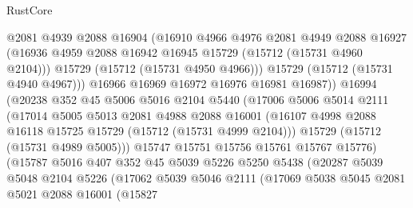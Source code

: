 \begin{lexlean}{RustCore}
\begin{coremodule}
                          @2081
                          @4939
                          @2088
                          @16904
                          (@16910
                            @4966
                            @4976
                            @2081
                            @4949
                            @2088
                            @16927
                            (@16936 @4959 @2088 @16942 @16945 @15729 (@15712 (@15731 @4960 @2104)))
                            @15729
                            (@15712 (@15731 @4950 @4966)))
                          @15729
                          (@15712 (@15731 @4940 @4967)))
                        @16966
                        @16969
                        @16972
                        @16976
                        @16981
                        @16987))
                    @16994
                    (@20238
                      @352
                      @45
                      @5006
                      @5016
                      @2104
                      @5440
                      (@17006
                        @5006
                        @5014
                        @2111
                        (@17014
                          @5005
                          @5013
                          @2081
                          @4988
                          @2088
                          @16001
                          (@16107 @4998 @2088 @16118 @15725 @15729 (@15712 (@15731 @4999 @2104)))
                          @15729
                          (@15712 (@15731 @4989 @5005)))
                        @15747
                        @15751
                        @15756
                        @15761
                        @15767
                        @15776)
                      (@15787
                        @5016
                        @407
                        @352
                        @45
                        @5039
                        @5226
                        @5250
                        @5438
                        (@20287
                          @5039
                          @5048
                          @2104
                          @5226
                          (@17062
                            @5039
                            @5046
                            @2111
                            (@17069
                              @5038
                              @5045
                              @2081
                              @5021
                              @2088
                              @16001
                              (@15827

\end{coremodule}
\end{lexlean}
